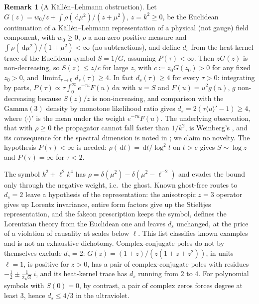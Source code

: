 \documentclass[11pt,a4paper,reqno]{amsart}
\theoremstyle{definition}
\newtheorem{remark}[theorem]{Remark}
\numberwithin{equation}{section}
\newcommand{\dif}{\,\mathrm{d}}
\begin{document}
\begin{remark}[A K\"all\'en--Lehmann obstruction]
\label{rem:kl_obstruction}
Let $G(z) = w_0/z + \int \rho(\dif\mu^2)/(z+\mu^2)$, $z = k^2 \ge 0$, be the Euclidean continuation of a K\"all\'en--Lehmann representation of a physical (not gauge) field component, with $w_0 \ge 0$, $\rho$ a non-zero positive measure and $\int \rho(\dif\mu^2)/(1+\mu^2) < \infty$ (no subtractions), and define $d_s$ from the heat-kernel trace of the Euclidean symbol $S = 1/G$, assuming $P(\tau) < \infty$. Then $zG(z)$ is non-decreasing, so $S(z) \le z/c$ for large $z$, with $c \coloneqq z_0G(z_0) > 0$ for any fixed $z_0 > 0$, and $\liminf_{\tau\to0} d_s(\tau) \ge 4$. In fact $d_s(\tau) \ge 4$ for every $\tau > 0$: integrating by parts, $P(\tau) \propto \tau\int_0^\infty e^{-\tau u} F(u)\dif u$ with $u = S$ and $F(u) = u^2 g(u)$, $g$ non-decreasing because $S(z)/z$ is non-increasing, and comparison with the $\mathrm{Gamma}(3)$ density by monotone likelihood ratio gives $d_s = 2(\tau\langle u\rangle' - 1) \ge 4$, where $\langle\cdot\rangle'$ is the mean under the weight $e^{-\tau u}F(u)$. The underlying observation, that with $\rho \ge 0$ the propagator cannot fall faster than $1/k^2$, is Weinberg's \cite[\S10.7]{weinberg1995quantum}, and its consequence for the spectral dimension is noted in \cite[\S IV]{belenchia2016spectral}; we claim no novelty. The hypothesis $P(\tau) < \infty$ is needed: $\rho(\dif t) = \dif t/\log^2 t$ on $t > e$ gives $S \sim \log z$ and $P(\tau) = \infty$ for $\tau < 2$.

The symbol $k^2 + \ell^2 k^4$ has $\rho = \delta(\mu^2) - \delta(\mu^2 - \ell^{-2})$ and evades the bound only through the negative weight, i.e.\ the ghost. Known ghost-free routes to $d_s = 2$ leave a hypothesis of the representation: the anisotropic $z = 3$ operator gives up Lorentz invariance, entire form factors give up the Stieltjes representation, and the fakeon prescription \cite{anselmi2018fakeons} keeps the symbol, defines the Lorentzian theory from the Euclidean one and leaves $d_s$ unchanged, at the price of a violation of causality at scales below $\ell$. This list classifies known examples and is not an exhaustive dichotomy. Complex-conjugate poles do not by themselves exclude $d_s = 2$: $G(z) = (1+z)/(z(1+z+z^2))$, in units $\ell = 1$, is positive for $z > 0$, has a pair of complex-conjugate poles with residues $-\tfrac12 \pm \tfrac{1}{2\sqrt3}\,i$, and its heat-kernel trace has $d_s$ running from $2$ to $4$. For polynomial symbols with $S(0) = 0$, by contrast, a pair of complex zeros forces degree at least $3$, hence $d_s \le 4/3$ in the ultraviolet.
\end{remark}
\end{document}
